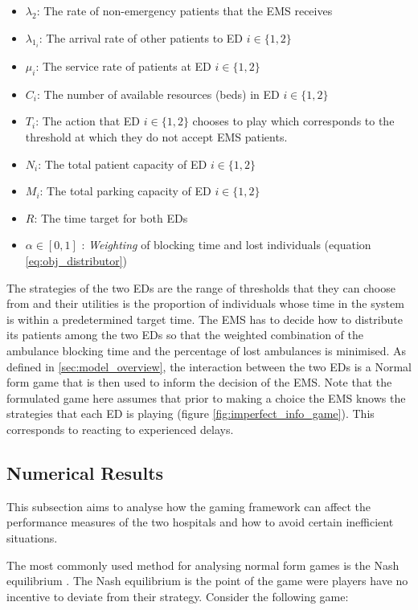 \begin{itemize}
    \item \( \lambda_2 \): The rate of non-emergency patients that the EMS 
    receives
    \item \( \lambda_{1_i} \): The arrival rate of other patients to ED \(i\in\{1, 2\}\)
    \item \( \mu_i \): The service rate of patients at ED \(i\in\{1, 2\}\)
    \item \( C_i \): The number of available resources (beds) in ED \(i\in\{1, 2\}\)  
    \item \( T_i \): The action that ED \(i\in\{1, 2\} \) chooses to play which 
    corresponds to the threshold at which they do not accept EMS patients.
    \item \( N_i \): The total patient capacity of ED \(i\in\{1, 2\} \)
    \item \( M_i \): The total parking capacity of ED \(i\in\{1, 2\} \)
    \item \( R \): The time target for both EDs
    \item \( \alpha \in [0, 1] \) : \textit{Weighting} of blocking time and 
    lost individuals (equation \ref{eq:obj_distributor})
\end{itemize}

The strategies of the two EDs are the range of thresholds that they can choose
from and their utilities is the proportion of individuals whose time in the 
system is within a predetermined target time.
The EMS has to decide how to distribute its patients among the two EDs so that 
the weighted combination of the ambulance blocking time and the percentage of 
lost ambulances is minimised. 
As defined in \ref{sec:model_overview}, the interaction between the two EDs 
is a Normal form game that is then used to inform the decision of the EMS.
Note that the formulated game here assumes that prior to making a choice the 
EMS knows the strategies that each ED is playing (figure 
\ref{fig:imperfect_info_game}). This corresponds to reacting to experienced delays.

\subsection{Numerical Results}

This subsection aims to analyse how the gaming framework can affect the 
performance measures of the two hospitals and how to avoid certain inefficient 
situations.

The most commonly used method for analysing normal form games is the Nash 
equilibrium \cite{kreps1989nash}. 
The Nash equilibrium is the point of the game were players have no incentive to 
deviate from their strategy.
Consider the following game:


